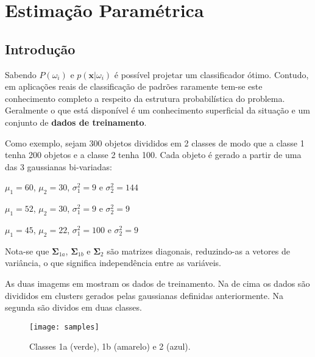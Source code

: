 \section{Estimação Paramétrica}

\subsection{Introdução}

Sabendo $P(\omega_i)$ e $p(\boldsymbol{x}|\omega_i)$ é possível projetar um classificador ótimo. Contudo, em aplicações reais de classificação de padrões raramente tem-se este conhecimento completo a respeito da estrutura probabilística do problema. Geralmente o que está disponível é um conhecimento superficial da situação e um conjunto de \textbf{dados de treinamento}.

Como exemplo, sejam 300 objetos divididos em 2 classes de modo que a classe 1 tenha 200 objetos e a classe 2 tenha 100. Cada objeto é gerado a partir de uma das 3 gaussianas bi-variadas:

\begin{description}\itemsep0pt
    \item[1a:] $\mu_1 = 60$, $\mu_2 = 30$, $\sigma_1^2 = 9$ e $\sigma_2^2 = 144$
    \item[1b:] $\mu_1 = 52$, $\mu_2 = 30$, $\sigma_1^2 = 9$ e $\sigma_2^2 = 9$
    \item[2:] $\mu_1 = 45$, $\mu_2 = 22$, $\sigma_1^2 = 100$ e $\sigma_2^2 = 9$
\end{description}

\noindent Nota-se que $\boldsymbol{\Sigma}_{1a}$, $\boldsymbol{\Sigma}_{1b}$ e $\boldsymbol{\Sigma}_2$ são matrizes diagonais, reduzindo-as a vetores de variância, o que significa independência entre as variáveis.

As duas imagems em  mostram os dados de treinamento. Na de cima os dados são divididos em clusters gerados pelas gaussianas definidas anteriormente. Na segunda são dividos em duas classes.

\begin{figure}[ht]
    \centering
    \texttt{[image: samples]}
    \caption{Classes 1a (verde), 1b (amarelo) e 2 (azul).}
    \label{fig:samples}
\end{figure}

